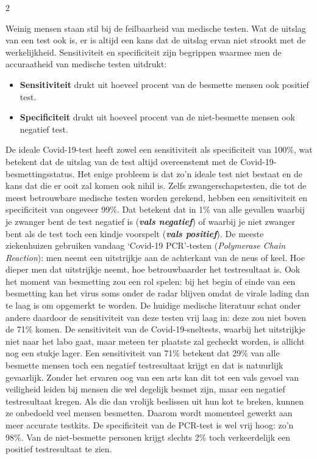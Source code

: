 \eindewerktekst
\begin{multicols}{2}

Weinig mensen staan stil bij de feilbaarheid van medische testen. Wat de uitslag van een test ook is, er is altijd een kans dat de uitslag ervan niet strookt met de werkelijkheid. Sensitiviteit en specificiteit zijn begrippen waarmee men de accuraatheid van medische testen uitdrukt:

\begin{itemize}
	\item \textbf{Sensitiviteit} drukt uit hoeveel procent van de besmette mensen ook positief test. 
	\item \textbf{Specificiteit} drukt uit hoeveel procent van de niet-besmette mensen ook negatief test.
\end{itemize}

De ideale Covid-19-test heeft zowel een sensitiviteit als specificiteit van 100\%, wat betekent dat de uitslag van de test altijd overeenstemt met de Covid-19-besmettingsstatus. Het enige probleem is dat zo’n ideale test niet bestaat en de kans dat die er ooit zal komen ook nihil is. Zelfs zwangerschapstesten, die tot de meest betrouwbare medische testen worden gerekend, hebben een sensitiviteit en specificiteit van ongeveer 99\%. Dat betekent dat in 1\% van alle gevallen waarbij je zwanger bent de test negatief is (\textbf{\textit{vals negatief}}) of waarbij je niet zwanger bent als de test toch een kindje voorspelt (\textit{\textbf{vals positief}}). 
De meeste ziekenhuizen gebruiken vandaag `Covid-19 PCR'-testen (\textit{Polymerase Chain Reaction}): men neemt een uitstrijkje aan de achterkant van de neus of keel. Hoe dieper men dat uitstrijkje neemt, hoe betrouwbaarder het testresultaat is. Ook het moment van besmetting zou een rol spelen: bij het begin of einde van een besmetting kan het virus soms onder de radar blijven omdat de virale lading dan te laag is om opgemerkt te worden. De huidige medische literatuur schat onder andere daardoor de sensitiviteit van deze testen vrij laag in: deze zou niet boven de 71\% komen. De sensitiviteit van de Covid-19-sneltests, waarbij het uitstrijkje niet naar het labo gaat, maar meteen ter plaatste zal gecheckt worden, is allicht nog een stukje lager. Een sensitiviteit van 71\% betekent dat 29\% van alle besmette mensen toch een negatief testresultaat krijgt en dat is natuurlijk gevaarlijk. Zonder het ervaren oog van een arts kan dit tot een vals gevoel van veiligheid leiden bij mensen die wel degelijk besmet zijn, maar een negatief testresultaat kregen. Als die dan vrolijk beslissen uit hun kot te breken, kunnen ze onbedoeld veel mensen besmetten. Daarom wordt momenteel gewerkt aan meer accurate testkits. De specificiteit van de PCR-test is wel vrij hoog: zo’n 98\%. Van de niet-besmette personen krijgt slechts 2\% toch verkeerdelijk een positief testresultaat te zien. 
\end{multicols}

